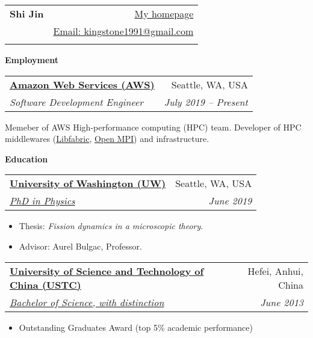 \documentclass[letterpaper,12pt]{article}
\makeatletter
\newcommand{\resheading}[1]{{\large \colorbox{mygrey}{\begin{minipage}{\textwidth}{\textbf{#1 \vphantom{p\^{E}}}}\end{minipage}}}}
\newcommand{\ressubheading}[4]{
\begin{tabular*}{6.5in}{l@{\extracolsep{\fill}}r}
		\textbf{#1} & #2 \\
		\textit{#3} & \textit{#4} \\
\end{tabular*}\vspace{-6pt}}
\makeatother
\begin{document}
\newcommand{\mywebheader}{
\begin{tabular*}{7in}{l@{\extracolsep{\fill}}r}
	\textbf{{\huge Shi Jin}} & \href{https://stoneking1991.github.io/}{My homepage}\\
  &   \href{mailto:kingstone1991@gmail.com}{Email: kingstone1991@gmail.com} \\
  & \Mobilefone{ Cell phone: $\mathnormal{+1}$ $\mathnormal{2066050419}$}
	\end{tabular*}
	\vspace{1cm}}

\mywebheader

\resheading{Employment}	

\vspace{0.2cm}

\ressubheading{\href{https://aws.amazon.com/}{Amazon Web Services (AWS) }}{\hspace{8.8cm} Seattle, WA, USA}
{Software Development Engineer}{July 2019 -- Present}

\vspace{0.4cm}

Memeber of AWS High-performance computing (HPC) team. Developer of HPC middlewares (\href{https://github.com/ofiwg/libfabric}{Libfabric}, \href{https://github.com/open-mpi/ompi}{Open MPI}) and infrastructure.
\vspace{0.4cm}

\resheading{Education}	

\vspace{0.2cm}

\ressubheading{\href{http://www.uw.edu}{University of Washington (UW) }}{\hspace{7.7cm} Seattle, WA, USA}{\href{https://sharepoint.washington.edu/phys/Pages/default.aspx}{PhD in Physics}}{\hspace{7.5cm} June 2019 }
			\begin{itemize}
			\itemsep0em
	\item
	Thesis: \textit{Fission dynamics in a microscopic theory}.
	\item
	 Advisor: Aurel Bulgac, Professor.		 	  
        \end{itemize}
				
\ressubheading{\href{http://en.ustc.edu.cn}{University of Science and Technology of China (USTC) }}{\hspace{2.5cm} Hefei, Anhui, China}{\href{http://physics.ustc.edu.cn}{Bachelor of Science, with distinction }}{\hspace{2.5cm} June 2013}
\begin{itemize}
\item
Outstanding Graduates Award (top 5\% academic performance)
\end{itemize}
				
\end{document}
